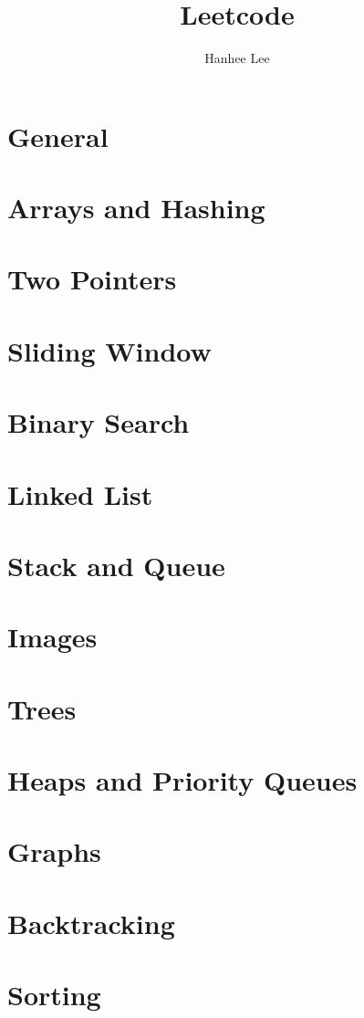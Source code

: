 \documentclass{article}
\title{Leetcode}
\author{Hanhee Lee}
\begin{document}
\maketitle

\tableofcontents
\newpage

\section{General}

\newpage

\section{Arrays and Hashing}

\newpage

\section{Two Pointers}

\newpage

\section{Sliding Window}

\newpage

\section{Binary Search}

\newpage

\section{Linked List}

\newpage

\section{Stack and Queue}

\newpage

\section{Images}

\newpage

\section{Trees}

\newpage

\section{Heaps and Priority Queues}

\newpage

\section{Graphs}

\newpage

\section{Backtracking}

\newpage

\section{Sorting}

\newpage
\end{document}

